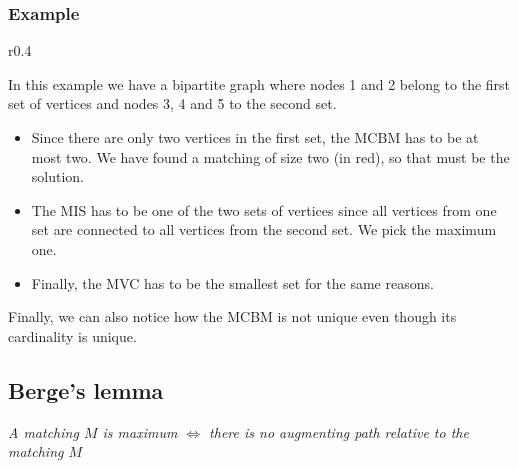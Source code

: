 \subsubsection*{Example}
\begin{wrapfigure}{r}{0.4\textwidth}
		\vspace{-30pt}
\centering
{}
\vspace{-40pt}
\end{wrapfigure}
In this example we have a bipartite graph where nodes 1 and 2 belong to the 
first set of vertices and nodes 3, 4 and 5 to the second set.
\begin{itemize}
		\item Since there are only two vertices in the first
				set, the MCBM has to be at most two. We have found
				a matching of size two (in red), so that must be
				the solution.
		\item The MIS has to be one of the two sets of vertices since all
				vertices from one set are connected to all vertices from the
				second set. We pick the maximum one. 
		\item Finally, the MVC has to be the smallest set for the same reasons.
\end{itemize}
Finally, we can also notice how the MCBM is not unique even though its cardinality is 
unique.
\subsection*{Berge's lemma}
\textit{A matching $M$ is maximum $\iff$ there is no augmenting path relative to the
		matching $M$}
